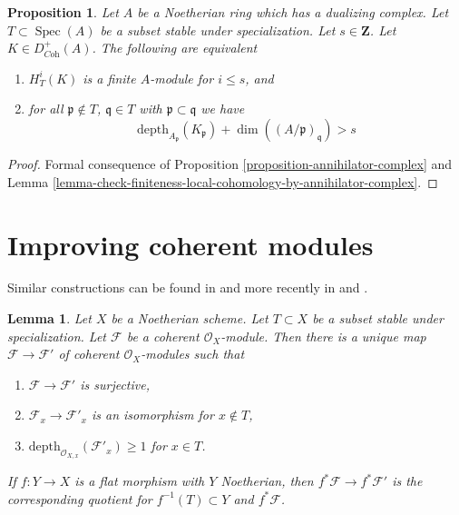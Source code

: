 \documentclass{stacks-project}
\theoremstyle{plain}
\newtheorem{proposition}[subsection]{Proposition}
\newtheorem{lemma}[subsection]{Lemma}
\theoremstyle{definition}
\theoremstyle{remark}
\numberwithin{equation}{subsection}
\def\Spec{\mathop{\mathrm{Spec}}}
\begin{document}
\begin{proposition}
\label{proposition-finiteness-complex}
Let $A$ be a Noetherian ring which has a dualizing complex.
Let $T \subset \Spec(A)$ be a subset stable under specialization.
Let $s \in \mathbf{Z}$. Let $K \in D_{\textit{Coh}}^+(A)$.
The following are equivalent
\begin{enumerate}
\item $H^i_T(K)$ is a finite $A$-module for $i \leq s$, and
\item for all $\mathfrak p \not \in T$, $\mathfrak q \in T$ with
$\mathfrak p \subset \mathfrak q$ we have
$$
\text{depth}_{A_\mathfrak p}(K_\mathfrak p) +
\dim((A/\mathfrak p)_\mathfrak q) > s
$$
\end{enumerate}
\end{proposition}

\begin{proof}
Formal consequence of
Proposition \ref{proposition-annihilator-complex} and
Lemma \ref{lemma-check-finiteness-local-cohomology-by-annihilator-complex}.
\end{proof}






\section{Improving coherent modules}
\label{section-improve}

\noindent
Similar constructions can be found in \cite{EGA} and more recently in
\cite{Kollar-local-global-hulls} and \cite{Kollar-variants}.

\begin{lemma}
\label{lemma-get-depth-1-along-Z}
Let $X$ be a Noetherian scheme. Let $T \subset X$ be a subset
stable under specialization. Let $\mathcal{F}$ be a coherent
$\mathcal{O}_X$-module. Then there is a unique map
$\mathcal{F} \to \mathcal{F}'$ of coherent $\mathcal{O}_X$-modules
such that
\begin{enumerate}
\item $\mathcal{F} \to \mathcal{F}'$ is surjective,
\item $\mathcal{F}_x \to \mathcal{F}'_x$ is an isomorphism for $x \not \in T$,
\item $\text{depth}_{\mathcal{O}_{X, x}}(\mathcal{F}'_x) \geq 1$ for $x \in T$.
\end{enumerate}
If $f : Y \to X$ is a flat morphism with $Y$ Noetherian, then
$f^*\mathcal{F} \to f^*\mathcal{F}'$ is the corresponding
quotient for $f^{-1}(T) \subset Y$ and $f^*\mathcal{F}$.
\end{lemma}
\end{document}
